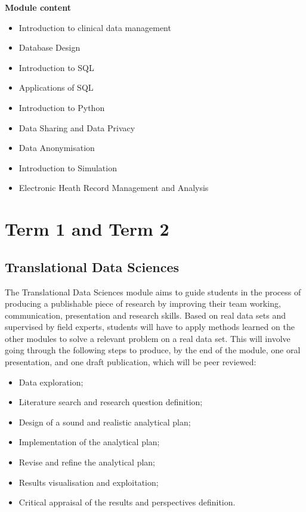 \documentclass[
]{book}
\providecommand{\tightlist}{%
  \setlength{\itemsep}{0pt}\setlength{\parskip}{0pt}}
\begin{document}
\textbf{Module content}

\begin{itemize}
\tightlist
\item
  Introduction to clinical data management
\item
  Database Design
\item
  Introduction to SQL
\item
  Applications of SQL
\item
  Introduction to Python
\item
  Data Sharing and Data Privacy
\item
  Data Anonymisation
\item
  Introduction to Simulation
\item
  Electronic Heath Record Management and Analysis
\end{itemize}

\section*{Term 1 and Term 2}\label{term-1-and-term-2}

\subsection*{Translational Data Sciences}\label{translational-data-sciences}

The Translational Data Sciences module aims to guide students in the process of producing a publishable piece of research by improving their team working, communication, presentation and research skills. Based on real data sets and supervised by field experts, students will have to apply methods learned on the other modules to solve a relevant problem on a real data set. This will involve going through the following steps to produce, by the end of the module, one oral presentation, and one draft publication, which will be peer reviewed:

\begin{itemize}
\tightlist
\item
  Data exploration;
\item
  Literature search and research question definition;
\item
  Design of a sound and realistic analytical plan;
\item
  Implementation of the analytical plan;
\item
  Revise and refine the analytical plan;
\item
  Results visualisation and exploitation;
\item
  Critical appraisal of the results and perspectives definition.
\end{itemize}
\end{document}
